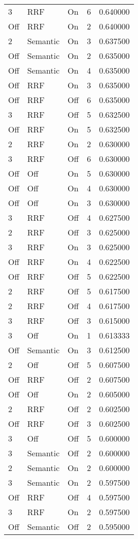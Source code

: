 \begin{tabular}{llllr}
3 & RRF & On & 6 & 0.640000 \\
Off & RRF & On & 2 & 0.640000 \\
2 & Semantic & On & 3 & 0.637500 \\
Off & Semantic & On & 2 & 0.635000 \\
Off & Semantic & On & 4 & 0.635000 \\
Off & RRF & On & 3 & 0.635000 \\
Off & RRF & Off & 6 & 0.635000 \\
3 & RRF & Off & 5 & 0.632500 \\
Off & RRF & On & 5 & 0.632500 \\
2 & RRF & On & 2 & 0.630000 \\
3 & RRF & Off & 6 & 0.630000 \\
Off & Off & On & 5 & 0.630000 \\
Off & Off & On & 4 & 0.630000 \\
Off & Off & On & 3 & 0.630000 \\
3 & RRF & Off & 4 & 0.627500 \\
2 & RRF & Off & 3 & 0.625000 \\
3 & RRF & On & 3 & 0.625000 \\
Off & RRF & On & 4 & 0.622500 \\
Off & RRF & Off & 5 & 0.622500 \\
2 & RRF & Off & 5 & 0.617500 \\
2 & RRF & Off & 4 & 0.617500 \\
3 & RRF & Off & 3 & 0.615000 \\
3 & Off & On & 1 & 0.613333 \\
Off & Semantic & On & 3 & 0.612500 \\
2 & Off & Off & 5 & 0.607500 \\
Off & RRF & Off & 2 & 0.607500 \\
Off & Off & On & 2 & 0.605000 \\
2 & RRF & Off & 2 & 0.602500 \\
Off & RRF & Off & 3 & 0.602500 \\
3 & Off & Off & 5 & 0.600000 \\
3 & Semantic & Off & 2 & 0.600000 \\
2 & Semantic & On & 2 & 0.600000 \\
3 & Semantic & On & 2 & 0.597500 \\
Off & RRF & Off & 4 & 0.597500 \\
3 & RRF & On & 2 & 0.597500 \\
Off & Semantic & Off & 2 & 0.595000 \\

\end{tabular}
